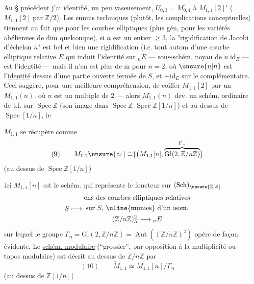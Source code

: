 Au \S{} précédent j'ai identifié, un peu
vaseusement, $U_{0,3}=M^{!}_{0,4}$\unsure{,} à $M_{1,1}[2]'$\unsure{,}
( $M_{1,1}[2]$
 par
$\mathbb{Z}/2$). Les ennuis techniques (plutôt,
les complications conceptuelles) tiennent
au fait que pour les courbes elliptiques
(plus gén, pour les variétés abéliennes de
dim quelconque), si $n$ est un entier $\ge 3$,
la "rigidification de Jacobi d'échelon $n$" est
bel et bien une rigidification (i.e.
tout autom d'une courbe elliptique
relative $E$ qui induit l'identité sur
${}_nE$ --- sous-schém. noyau de $n.\mathrm{id}_E$ --- est
l'identité --- mais il n'en est plus de
$\overline{\mathrm m}$ pour $n=2$, où $\unsure{u|n}$ est l'\uline{identité}  dessus
d'une partie ouverte fermée de $S$, et $-\mathrm{id}_E$
sur le complémentaire. Ceci suggère, pour
une meilleure compréhension, de coiffer
$M_{1,1}[2]$ par un $M_{1,1}(n)$, où $n$ est un
multiple de $2$ --- alors $M_{1,1}(n)$ dev. un
schém. ordinaire de t.f. sur $\operatorname{Spec}\mathbb{Z}$
(son image dans $\operatorname{Spec}\mathbb{Z}$   $\operatorname{Spec}\mathbb{Z}[1/n]$)
et au dessus de $\operatorname{Spec}[1/n]$, le 

$M_{1,1}$ se récupère comme
\[
(9)\qquad
M_{1,1}\unsure{\simeq|\cong}
\bigl(M_{1,1}[n],\overbrace{\mathrm{Gl}(2,\mathbb Z/n\mathbb Z)}^{\Gamma_n}\bigr)
\]
(au dessus de $\operatorname{Spec}\mathbb Z[1/n]$)


Ici $M_{1,1}[n]$ est le schém. qui représente le foncteur sur $(\mathrm{Sch})_{\unsure{\mathbb Z|S}}$
\[
S\longmapsto
\begin{gathered}
\text{ens des courbes elliptiques relatives}\\
\text{sur $S$, \uline{munies} d'un isom.}\\
(\mathbb Z/n\mathbb Z)^2_S\longrightarrow {}_nE
\end{gathered}
\]
sur lequel le groupe $\Gamma_n=\mathrm{Gl}(2,\mathbb Z/n\mathbb Z)=\operatorname{Aut}((\mathbb Z/n\mathbb Z)^2)$ opère de façon évidente.  Le \uline{schém. modulaire} (``grossier'', par opposition à la multiplicité ou topos modulaire) est décrit au dessus de $\mathbb Z/n\mathbb Z$ par
\[
(10)\qquad \widetilde M_{1,1}\simeq M_{1,1}[n]/\Gamma_n
\]
(au dessus de $\mathbb Z[1/n]$)

